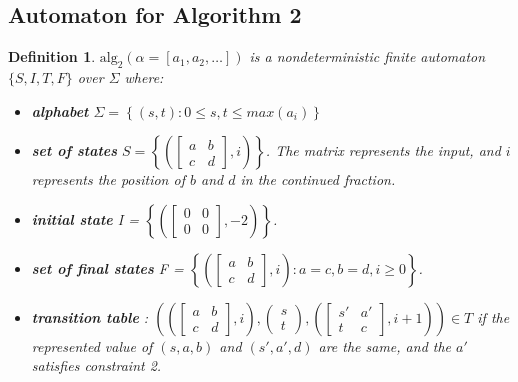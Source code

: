 \documentclass[a4paper]{article}
\newtheorem{definition}{Definition}
\begin{document}
\subsection*{Automaton for Algorithm 2}

\begin{definition}
    $\text{alg}_2(\alpha = [a_1,a_2,\dots])$ is a nondeterministic finite automaton $\{S,I,T,F\}$ over $\Sigma$ where:
    \begin{itemize}
    \item \textbf{alphabet} $\Sigma = \left\{(s,t) : 0\le s,t \le max(a_i) \right\}$
   \item \textbf{set of states} $S = \left\{\left(\begin{bmatrix}a&b\\c&d\end{bmatrix},i\right)\right\}$. The matrix represents the input,  and $i$ represents the position of $b$ and $d$ in the continued fraction.
   \item \textbf{initial state} I = $\left\{\left(\begin{bmatrix}0&0\\0&0\end{bmatrix},-2\right)\right\}$.
   \item \textbf{set of final states} F = $\left\{\left(\begin{bmatrix}a&b\\c&d\end{bmatrix},i\right):a=c,b=d, i\ge0\right\}$.
   \item \textbf{transition table} :  $\left(\left(\begin{bmatrix}a&b\\c&d\end{bmatrix},i\right), \begin{pmatrix}s\\t\end{pmatrix}, \left(\begin{bmatrix}s'&a'\\t&c\end{bmatrix},i+1\right)  \right) \in T$ if the represented value of $(s,a,b)$ and $(s',a',d)$ are the same, and the $a'$ satisfies constraint 2.
   \end{itemize}
\end{definition}
\end{document}
